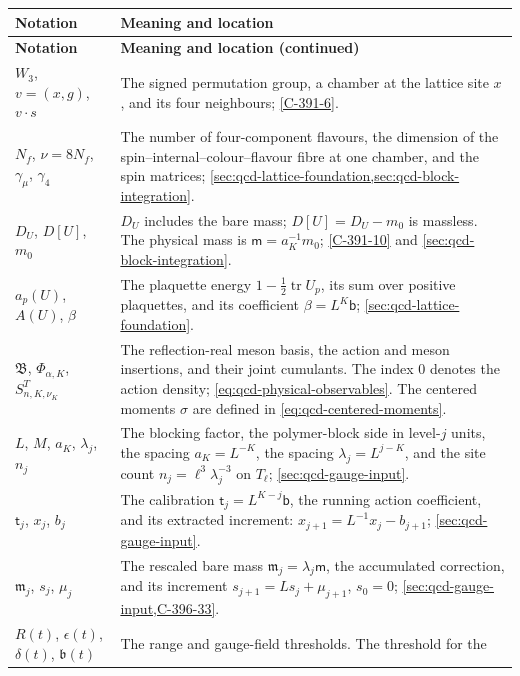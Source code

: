 \documentclass[11pt,letterpaper,reqno]{amsart}
\theoremstyle{definition}
\theoremstyle{remark}
\begin{document}
\begingroup
\small
\renewcommand{\arraystretch}{1.12}
\begin{longtable}{@{}p{}@{\hspace{0.025\textwidth}}p{}@{}}
\textbf{Notation} & \textbf{Meaning and location}\\
\hline
\endfirsthead
\textbf{Notation} & \textbf{Meaning and location (continued)}\\
\hline
\endhead
\endfoot
\endlastfoot
$W_3$, $v=(x,g)$, $v\cdot s$
& The signed permutation group, a chamber at the lattice site $x$,
and its four neighbours; \eqref{C-391-6}.\\
$N_f$, $\nu=8N_f$, $\gamma_\mu$, $\gamma_4$
& The number of four-component flavours, the dimension of the
spin--internal--colour--flavour fibre at one chamber, and the spin
matrices; \cref{sec:qcd-lattice-foundation,sec:qcd-block-integration}.\\
$D_U$, $D[U]$, $m_0$
& $D_U$ includes the bare mass; $D[U]=D_U-m_0$ is massless.
The physical mass is $\mathsf m=a_K^{-1}m_0$;
\eqref{C-391-10} and \cref{sec:qcd-block-integration}.\\
$a_p(U)$, $A(U)$, $\beta$
& The plaquette energy $1-\tfrac12\operatorname{tr}U_p$, its sum
over positive plaquettes, and its coefficient $\beta=L^K\mathsf b$;
\cref{sec:qcd-lattice-foundation}.\\
$\mathfrak B$, $\Phi_{\alpha,K}$, $S^T_{n,K,\nu_K}$
& The reflection-real meson basis, the action and meson insertions,
and their joint cumulants. The index $0$ denotes the action density;
\eqref{eq:qcd-physical-observables}. The centered moments $\sigma$
are defined in \eqref{eq:qcd-centered-moments}.\\
$L$, $M$, $a_K$, $\lambda_j$, $n_j$
& The blocking factor, the polymer-block side in level-$j$ units,
the spacing $a_K=L^{-K}$, the spacing $\lambda_j=L^{j-K}$,
and the site count $n_j=\ell^3\lambda_j^{-3}$ on $T_\ell$;
\cref{sec:qcd-gauge-input}.\\
$\mathsf t_j$, $x_j$, $b_j$
& The calibration $\mathsf t_j=L^{K-j}\mathsf b$, the running
action coefficient, and its extracted increment:
$x_{j+1}=L^{-1}x_j-b_{j+1}$; \cref{sec:qcd-gauge-input}.\\
$\mathfrak m_j$, $s_j$, $\mu_j$
& The rescaled bare mass $\mathfrak m_j=\lambda_j\mathsf m$,
the accumulated correction, and its increment
$s_{j+1}=Ls_j+\mu_{j+1}$, $s_0=0$;
\cref{sec:qcd-gauge-input,C-396-33}.\\
$R(t)$, $\epsilon(t)$, $\delta(t)$, $\mathfrak b(t)$
& The range and gauge-field thresholds. The threshold for the

\end{longtable}
\end{document}
